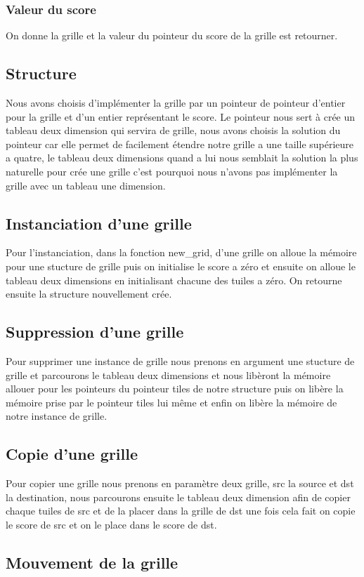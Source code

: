 \documentclass{article}
\begin{document}
\subsubsection{Valeur du score}
On donne la grille et la valeur du pointeur du score de la grille est retourner.
\subsection{Structure}
Nous avons choisis d'implémenter la grille par un pointeur de pointeur d'entier pour la grille et d'un entier représentant le score. Le pointeur nous sert à crée un tableau deux dimension qui servira de grille, nous avons choisis la solution du pointeur car elle permet de facilement étendre notre grille a une taille supérieure a quatre, le tableau deux dimensions quand a lui nous semblait la solution la plus naturelle pour crée une grille c'est pourquoi nous n'avons pas implémenter la grille avec un tableau une dimension.
\subsection{Instanciation d'une grille}
Pour l'instanciation, dans la fonction new\_grid, d'une grille on alloue la mémoire pour une stucture de grille puis on initialise le score a zéro et ensuite on alloue le tableau deux dimensions en initialisant chacune des tuiles a zéro. On retourne ensuite la structure nouvellement crée.
\subsection{Suppression d'une grille}
Pour supprimer une instance de grille nous prenons en argument une stucture de grille et parcourons le tableau deux dimensions et nous libèront la mémoire allouer pour les pointeurs du pointeur tiles de notre structure puis on libère la mémoire prise par le pointeur tiles lui même et enfin on libère la mémoire de notre instance de grille.
\subsection{Copie d'une grille}
Pour copier une grille nous prenons en paramètre deux grille, src la source et dst la destination, nous parcourons ensuite le tableau deux dimension afin de copier chaque tuiles de src et de la placer dans la grille de dst une fois cela fait on copie le score de src et on le place dans le score de dst.
\subsection{Mouvement de la grille}
\end{document}
